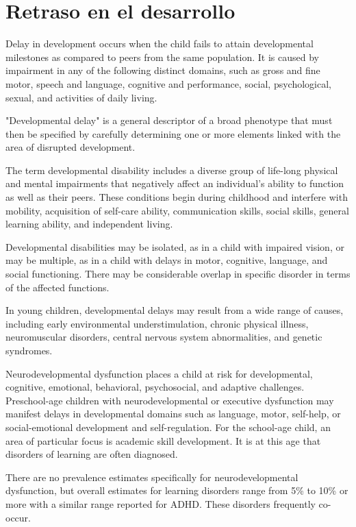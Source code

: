 \section{Retraso en el desarrollo}

Delay in development occurs when the child fails to attain developmental
milestones as compared to peers from the same population. It is caused by
impairment in any of the following distinct domains, such as gross and fine
motor, speech and language, cognitive and performance, social, psychological,
sexual, and activities of daily living. \cite{DevelopmentalDelay}

"Developmental delay" is a general descriptor of a broad phenotype that must
then be specified by carefully determining one or more elements linked with the
area of disrupted development. \cite{DevelopmentalDelay}

The term developmental disability includes a diverse group of life-long
physical and mental impairments that negatively affect an individual’s ability
to function as well as their peers. These conditions begin during childhood and
interfere with mobility, acquisition of self-care ability, communication
skills, social skills, general learning ability, and independent living.
\cite{Simms2023}

Developmental disabilities may be isolated, as in a child with impaired vision,
or may be multiple, as in a child with delays in motor, cognitive, language,
and social functioning. There may be considerable overlap in specific disorder
in terms of the affected functions. \cite{Simms2023}

In young children, developmental delays may result from a wide range of causes,
including early environmental understimulation, chronic physical illness,
neuromuscular disorders, central nervous system abnormalities, and genetic
syndromes. \cite{Simms2023}

Neurodevelopmental dysfunction places a child at risk for developmental,
cognitive, emotional, behavioral, psychosocial, and adaptive challenges.
Preschool-age children with neurodevelopmental or executive dysfunction may
manifest delays in developmental domains such as language, motor, self-help, or
social-emotional development and self-regulation. For the school-age child, an
area of particular focus is academic skill development. It is at this age that
disorders of learning are often diagnosed. \cite{Nelson49}

There are no prevalence estimates specifically for neurodevelopmental
dysfunction, but overall estimates for learning disorders range from 5\% to
10\% or more with a similar range reported for ADHD. These disorders frequently
co-occur.
